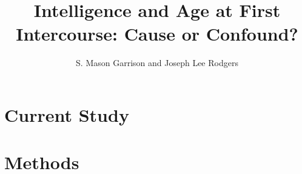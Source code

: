 \documentclass[a4paper,man,apacite,natbib,12pt]{apa6}\usepackage[]{graphicx}\usepackage[]{color}
\title{Intelligence and Age at First Intercourse: Cause or Confound?}
\author{S. Mason Garrison and Joseph Lee Rodgers}
\affiliation{Vanderbilt University}
\begin{document}
\maketitle


\section{Current Study}\label{current_study}\vspace{-.61cm}

\section{Methods}









\end{document}
